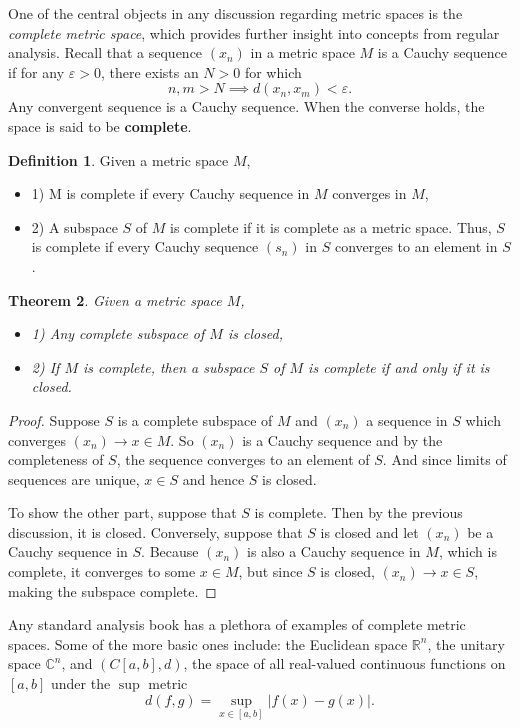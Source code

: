 \documentclass{article}
\newtheorem{thm}{Theorem}[section]
\theoremstyle{definition}
\newtheorem{defn}[thm]{Definition}
\theoremstyle{remark}
\numberwithin{equation}{section}
\begin{document}
One of the central objects in any discussion regarding metric spaces is the \textit{complete metric space}, which provides further insight into concepts from regular analysis. Recall that a sequence $(x_n)$ in a metric space $M$ is a Cauchy sequence if for any $\varepsilon > 0$, there exists an $N> 0$ for which 
$$n, m > N \implies d(x_n, x_m ) < \varepsilon . $$
Any convergent sequence is a Cauchy sequence. When the converse holds, the space is said to be \textbf{complete}. 

\begin{defn}
Given a metric space $M$, 
\begin{itemize}
    \item 1) M is complete if every Cauchy sequence in $M$ converges in $M$, 
    \item 2) A subspace $S$ of $M$ is complete if it is complete as a metric space. Thus, $S$ is complete if every Cauchy sequence $(s_n)$ in $S$ converges to an element in $S$. 
\end{itemize}
\end{defn}

\begin{thm}
Given a metric space $M$, 
\begin{itemize}
    \item 1) Any complete subspace of $M$ is closed, 
    \item 2) If $M$ is complete, then a subspace $S$ of $M$ is complete if and only if it is closed.
\end{itemize}
\end{thm}

\begin{proof}
Suppose $S$ is a complete subspace of $M$ and $(x_n)$ a sequence in $S$ which converges $(x_n) \rightarrow x \in M$. So $(x_n)$ is a Cauchy sequence and by the completeness of $S$, the sequence converges to an element of $S$. And since limits of sequences are unique, $x \in S$ and hence $S$ is closed. 

To show the other part, suppose that $S$ is complete. Then by the previous discussion, it is closed. Conversely, suppose that $S$ is closed and let $(x_n)$ be a Cauchy sequence in $S$. Because $(x_n)$ is also a Cauchy sequence in $M$, which is complete, it converges to some $x \in M$, but since $S$ is closed, $(x_n) \rightarrow x \in S$, making the subspace complete. 
\end{proof}

Any standard analysis book has a plethora of examples of complete metric spaces. Some of the more basic ones include: the Euclidean space $\mathbb{R}^n$, the unitary space $\mathbb{C}^n$, and $(C[a,b], d)$, the space of all real-valued continuous functions on $[a,b]$ under the $\sup$ metric 
$$d(f,g) = \sup _{x \in [a,b]} |f(x) - g(x)|.$$
\end{document}
